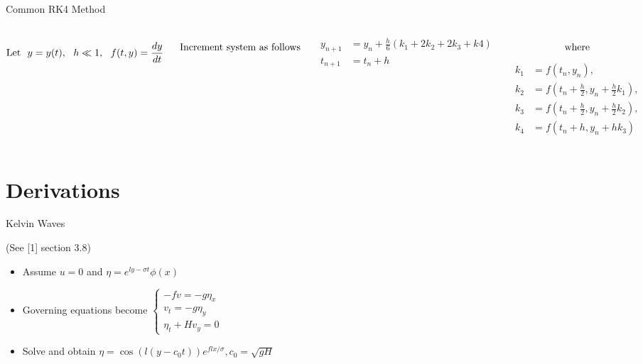 \documentclass{beamer}
\begin{document}

\setlength{\abovedisplayskip}{0pt}
\setlength{\belowdisplayskip}{0pt}
\setlength{\abovedisplayshortskip}{0pt}
\setlength{\belowdisplayshortskip}{0pt}

\usebackgroundtemplate{}
\begin{frame}{Common RK4 Method}

\begin{columns}


$$\textnormal{Let} \:\:\: y = y(t), \:\:\: h \ll 1, \:\:\: f(t,y) = \frac{dy}{dt}$$

$$\textnormal{Increment system as follows}$$

\begin{align*}
y_{n+1}&=y_n+\frac{h}{6}(k_1+2k_2+2k_3+k4) \\
t_{n+1}&=t_n+h
\end{align*}


$$\textnormal{where}$$
\begin{align*}
k_1 &= f(t_n,y_n),\\
k_2 &= f(t_n+\frac{h}{2},y_n+\frac{h}{2}k_1),\\
k_3 &= f(t_n+\frac{h}{2},y_n+\frac{h}{2}k_2),\\
k_4 &= f(t_n+h, y_n+h k_3)
\end{align*}

\end{columns}

\end{frame}

\section{Derivations} %

\begin{frame}{Kelvin Waves}

(See [1] section 3.8)

\begin{itemize}

\item Assume $u=0$ and $\eta= e^{ly-\sigma t}\phi(x)$

\item Governing equations become
$\begin{cases}
-fv=-g\eta_x \\
v_t=-g\eta_y \\
\eta_t+Hv_y=0
\end{cases}$

\item Solve and obtain
$\eta=\cos(l(y-c_0 t))e^{flx/\sigma}, c_0=\sqrt{gH}$

\end{itemize}

\end{frame}
\end{document}
